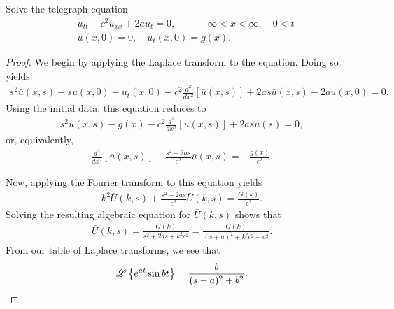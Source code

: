 \begin{problem}{4.40}
  Solve the telegraph equation
  \begin{align*}
    &u_{tt} - c^2 u_{xx} + 2a u_t = 0, \qquad -\infty < x < \infty, \quad 0 < t \\
    & u(x, 0) = 0, \quad u_t(x,0) = g(x).
  \end{align*}
\end{problem}

\begin{proof}


  We begin by applying the Laplace transform
  to the equation. Doing so yields
  \begin{align*}
    s^2\bar{u}(x, s) -su(x, 0) - u_t(x, 0) -c^2 \frac{d^2}{dx^2}\left[\bar{u}(x, s)\right] + 2as\bar{u}(x, s) - 2au(x, 0) = 0.
  \end{align*}
  Using the initial data, this equation reduces to
  \begin{align*}
    s^2\bar{u}(x, s) - g(x) -c^2 \frac{d^2}{dx^2}\left[\bar{u}(x, s)\right] + 2as\bar{u}(s) = 0,
  \end{align*}
  or, equivalently,
  \begin{align*}
    \frac{d^2}{dx^2}\left[\bar{u}(x, s)\right] - \frac{s^2 + 2as}{c^2}\bar{u}(x, s)= -\frac{g(x)}{c^2}.
  \end{align*}

  Now, applying the Fourier transform to this equation yields
  \begin{align*}
    k^2 \bar{U}(k, s) + \frac{s^2 + 2as}{c^2}\bar{U}(k, s)= \frac{G(k)}{c^2}.
  \end{align*}
  Solving the resulting algebraic equation for $\bar{U}(k, s)$ shows that
  \begin{align*}
    \bar{U}(k, s) = \frac{G(k)}{s^2 + 2as + k^2c^2} = \frac{G(k)}{(s+ a)^2 + k^2c^2- a^2 }.
  \end{align*}
  From our table of Laplace transforms, we see that
  \begin{align*}
    \mathscr{L}\left\{ {e^{at}\sin bt} \right\} = \frac{b}{(s-a)^2+b^2}.
  \end{align*}


\end{proof}
